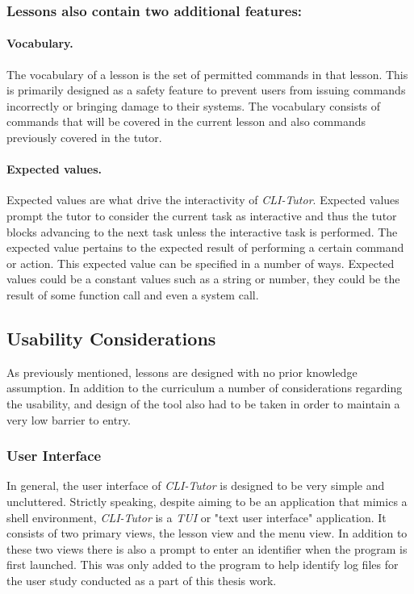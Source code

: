 \subsubsection{Lessons also contain two additional features:}

\paragraph{Vocabulary.}  The vocabulary of a lesson is the set of permitted
commands in that lesson. This is primarily designed as a safety feature to
prevent users from issuing commands incorrectly or bringing damage to their
systems. The vocabulary consists of commands that will be covered in the
current lesson and also commands previously covered in the tutor.

\paragraph{Expected values.} Expected values are what drive the interactivity
of \textit{CLI-Tutor}. Expected values prompt the tutor to consider the current
task as interactive and thus the tutor blocks advancing to the next task unless
the interactive task is performed. The expected value pertains to the expected
result of performing a certain command or action. This expected value can be
specified in a number of ways. Expected values could be a constant values such
as a string or number, they could be the result of some function call and even
a system call.

\subsection{Usability Considerations}

As previously mentioned, lessons are designed with no prior knowledge
assumption. In addition to the curriculum a number of considerations regarding
the usability, and design of the tool also had to be taken in order to
maintain a very low barrier to entry.

\subsubsection{User Interface}
In general, the user interface of \textit{CLI-Tutor} is designed to be very
simple and uncluttered. Strictly speaking, despite aiming to be an application
that mimics a shell environment, \textit{CLI-Tutor} is a \textit{TUI} or "text
user interface" application. It consists of two primary views, the lesson view
and the menu view. In addition to these two views there is also a prompt to
enter an identifier when the program is first launched. This was only added to
the program to help identify log files for the user study conducted as a part
of this thesis work.

